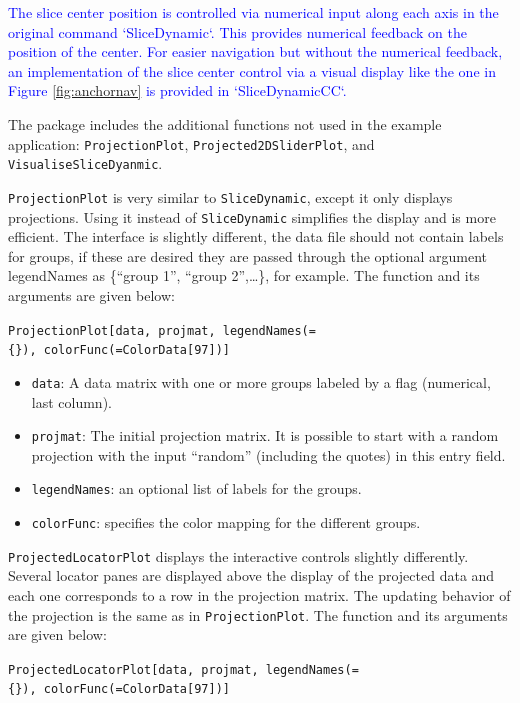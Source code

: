 \documentclass[]{interact}
\theoremstyle{plain}%
\theoremstyle{definition}
\theoremstyle{remark}
\providecommand{\tightlist}{%
  \setlength{\itemsep}{0pt}\setlength{\parskip}{0pt}}
\def\tightlist{}
\begin{document}
\textcolor{blue}{The slice center position is controlled via numerical input along each axis in the original command `SliceDynamic`. This provides numerical feedback on the position of the center. For easier navigation but without the numerical feedback, an implementation of the slice center control via a visual display like the one in Figure \ref{fig:anchornav} is provided in `SliceDynamicCC`.}

The package includes the additional functions not used in the example
application: \texttt{ProjectionPlot}, \texttt{Projected2DSliderPlot},
and \texttt{VisualiseSliceDyanmic}.

\texttt{ProjectionPlot} is very similar to \texttt{SliceDynamic}, except
it only displays projections. Using it instead of \texttt{SliceDynamic}
simplifies the display and is more efficient. The interface is slightly
different, the data file should not contain labels for groups, if these
are desired they are passed through the optional argument legendNames as
\{``group 1'', ``group 2'',\ldots\}, for example. The function and its
arguments are given below:

\texttt{ProjectionPlot{[}data,\ projmat,\ legendNames(=\{\}),\ colorFunc(=ColorData{[}97{]}){]}}

\begin{itemize}
\tightlist
\item
  \texttt{data}: A data matrix with one or more groups labeled by a flag
  (numerical, last column).
\item
  \texttt{projmat}: The initial projection matrix. It is possible to
  start with a random projection with the input ``random'' (including
  the quotes) in this entry field.
\item
  \texttt{legendNames}: an optional list of labels for the groups.
\item
  \texttt{colorFunc}: specifies the color mapping for the different
  groups.
\end{itemize}

\texttt{ProjectedLocatorPlot} displays the interactive controls slightly
differently. Several locator panes are displayed above the display of
the projected data and each one corresponds to a row in the projection
matrix. The updating behavior of the projection is the same as in
\texttt{ProjectionPlot}. The function and its arguments are given below:

\texttt{ProjectedLocatorPlot{[}data,\ projmat,\ legendNames(=\{\}),\ colorFunc(=ColorData{[}97{]}){]}}
\end{document}
